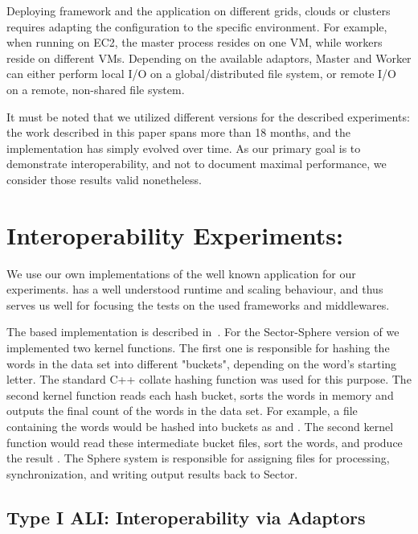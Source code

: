\documentclass[3p,twocolumn]{elsarticle}
\begin{document}
Deploying \sagamapreduce framework and the \wc application on
different grids, clouds or clusters requires adapting the configuration
to the specific environment.  For example, when running \sagamapreduce
on EC2, the master process resides on one VM, while workers reside on
different VMs.  Depending on the available adaptors, Master and Worker
can either perform local I/O on a global/distributed file system, or
remote I/O on a remote, non-shared file system.

It must be noted that we utilized different \smr versions for the
described experiments: the work described in this paper spans more
than 18 months, and the \smr implementation has simply evolved over
time.  As our primary goal is to demonstrate interoperability, and not
to document maximal performance, we consider those results valid
nonetheless.

\section{Interoperability Experiments: \Wc}
\label{sec:exp}


We use our own implementations of the well known \wc application for
our experiments.  \Wc has a well understood runtime and scaling
behaviour, and thus serves us well for focusing the tests on the used
frameworks and middlewares.

The \mr based \wc implementation is described in~\cite{saga_ccgrid09}.
For the Sector-Sphere version of \wc we implemented two kernel
functions. The first one is responsible for hashing the
words in the data set into different "buckets", depending on
the word's starting letter.  The standard C++ collate hashing function
was used for this purpose.  The second kernel function reads each hash
bucket, sorts the words in memory and outputs the final count of
the words in the data set.  For example, a file containing the words
 would be hashed into buckets as
 and .  The second kernel
function would read these intermediate bucket files, sort the words,
and produce the result .  The Sphere system is responsible for assigning files for
processing, synchronization, and writing output results back to
Sector.

\subsection{Type I ALI: Interoperability via Adaptors}
\end{document}
